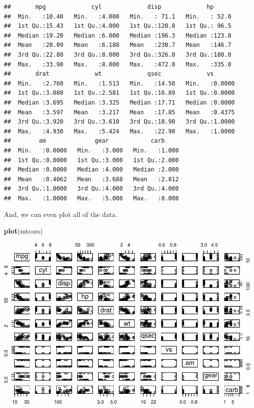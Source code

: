 \documentclass[]{article}
\newenvironment{Shaded}{\begin{snugshade}}{\end{snugshade}}
\newcommand{\KeywordTok}[1]{\textcolor[rgb]{0.13,0.29,0.53}{\textbf{#1}}}
\newcommand{\NormalTok}[1]{#1}
\begin{document}
\begin{verbatim}
##       mpg             cyl             disp             hp       
##  Min.   :10.40   Min.   :4.000   Min.   : 71.1   Min.   : 52.0  
##  1st Qu.:15.43   1st Qu.:4.000   1st Qu.:120.8   1st Qu.: 96.5  
##  Median :19.20   Median :6.000   Median :196.3   Median :123.0  
##  Mean   :20.09   Mean   :6.188   Mean   :230.7   Mean   :146.7  
##  3rd Qu.:22.80   3rd Qu.:8.000   3rd Qu.:326.0   3rd Qu.:180.0  
##  Max.   :33.90   Max.   :8.000   Max.   :472.0   Max.   :335.0  
##       drat             wt             qsec             vs        
##  Min.   :2.760   Min.   :1.513   Min.   :14.50   Min.   :0.0000  
##  1st Qu.:3.080   1st Qu.:2.581   1st Qu.:16.89   1st Qu.:0.0000  
##  Median :3.695   Median :3.325   Median :17.71   Median :0.0000  
##  Mean   :3.597   Mean   :3.217   Mean   :17.85   Mean   :0.4375  
##  3rd Qu.:3.920   3rd Qu.:3.610   3rd Qu.:18.90   3rd Qu.:1.0000  
##  Max.   :4.930   Max.   :5.424   Max.   :22.90   Max.   :1.0000  
##        am              gear            carb      
##  Min.   :0.0000   Min.   :3.000   Min.   :1.000  
##  1st Qu.:0.0000   1st Qu.:3.000   1st Qu.:2.000  
##  Median :0.0000   Median :4.000   Median :2.000  
##  Mean   :0.4062   Mean   :3.688   Mean   :2.812  
##  3rd Qu.:1.0000   3rd Qu.:4.000   3rd Qu.:4.000  
##  Max.   :1.0000   Max.   :5.000   Max.   :8.000
\end{verbatim}

And, we can even plot all of the data.

\begin{Shaded}
\begin{Highlighting}[]
\KeywordTok{plot}\NormalTok{(mtcars)}
\end{Highlighting}
\end{Shaded}

\includegraphics{slow-r_files/figure-latex/unnamed-chunk-67-1.pdf}
\end{document}
